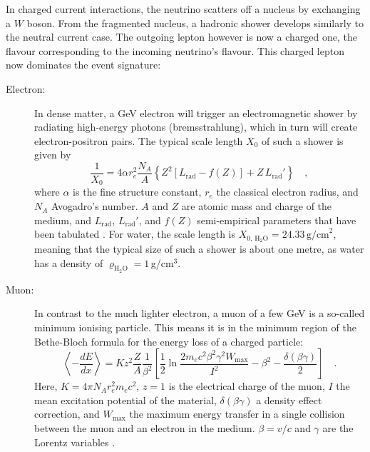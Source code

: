 In charged current interactions, the neutrino scatters off a nucleus by
exchanging a $W$ boson. From the fragmented nucleus, a hadronic shower develops
similarly to the neutral current case. The outgoing lepton however is now a
charged one, the flavour corresponding to the incoming neutrino's flavour. This
charged lepton now dominates the event signature:

\begin{description}
 \item[Electron:] In dense matter, a GeV electron will trigger an
  electromagnetic shower by radiating high-energy photons (bremsstrahlung),
  which in turn will create electron-positron pairs. The typical scale length
  $X_0$ of such a shower is given by
  \begin{equation}
   \frac{1}{X_0} = 4\alpha r_e^2 \frac{N_A}{A}
                    \left\{ Z^2 \left[L_\mathrm{rad} - f(Z) \right]
                    + Z\,L_\mathrm{rad}'\right\} \quad,
   \label{eqn:rad_length}
  \end{equation}
  where $\alpha$ is the fine structure constant, $r_e$ the classical electron
  radius, and $N_A$ Avogadro's number. $A$ and $Z$ are atomic mass and charge
  of the medium, and $L_\mathrm{rad}$, $L_\mathrm{rad}'$, and $f(Z)$
  semi-empirical parameters that have been tabulated \cite{PDG, bremsstrahlung}.
  For water, the scale length is $X_\mathrm{0,\,H_2O} =
  24.33\,\mathrm{g/cm}^2$, meaning that the typical size of such a shower is
  about one metre, as water has a density of $\varrho_\mathrm{H_2O} =
  1$\,g/cm$^3$.
 \item[Muon:] In contrast to the much lighter electron, a muon of a few GeV is
  a so-called minimum ionising particle. This means it is in the minimum region
  of the Bethe-Bloch formula for the energy loss of a charged particle:
  \begin{equation}
   \left\langle -\frac{dE}{dx}\right\rangle = Kz^2\frac{Z}{A}\frac{1}{\beta^2}
      \left[ \frac{1}{2}\ln\frac{2m_ec^2\beta^2\gamma^2 W_\mathrm{max}}{I^2}
             - \beta^2 - \frac{\delta(\beta\gamma)}{2} \right] \quad.
   \label{eqn:bethe-bloch}
  \end{equation}
  Here, $K = 4\pi N_A r_e^2 m_ec^2$, $z=1$ is the electrical charge of the
  muon, $I$ the mean excitation potential of the material, $\delta(\beta\gamma)$
  a density effect correction, and $W_\mathrm{max}$  the maximum energy transfer
  in a single collision between the muon and an  electron in the medium.
  $\beta = v/c$ and $\gamma$ are the Lorentz variables \cite{PDG}.


\end{description}
